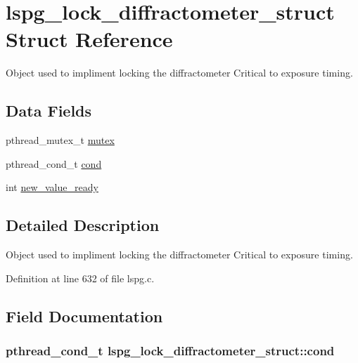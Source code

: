 \hypertarget{structlspg__lock__diffractometer__struct}{\section{lspg\-\_\-lock\-\_\-diffractometer\-\_\-struct Struct Reference}
\label{structlspg__lock__diffractometer__struct}
}


Object used to impliment locking the diffractometer Critical to exposure timing.  


\subsection*{Data Fields}
\begin{DoxyCompactItemize}
\item 
pthread\-\_\-mutex\-\_\-t \hyperlink{structlspg__lock__diffractometer__struct_a362e848dfd1551428b8d12d8776fd2ed}{mutex}
\item 
pthread\-\_\-cond\-\_\-t \hyperlink{structlspg__lock__diffractometer__struct_a7614c802af37c1d3358479a2c13ac898}{cond}
\item 
int \hyperlink{structlspg__lock__diffractometer__struct_ae94acdf44008ce48930e3083f08f5b6c}{new\-\_\-value\-\_\-ready}
\end{DoxyCompactItemize}


\subsection{Detailed Description}
Object used to impliment locking the diffractometer Critical to exposure timing. 

Definition at line 632 of file lspg.\-c.



\subsection{Field Documentation}
\hypertarget{structlspg__lock__diffractometer__struct_a7614c802af37c1d3358479a2c13ac898}{
\subsubsection[{cond}]{\setlength{\rightskip}{0pt plus 5cm}pthread\-\_\-cond\-\_\-t lspg\-\_\-lock\-\_\-diffractometer\-\_\-struct\-::cond}}\label{structlspg__lock__diffractometer__struct_a7614c802af37c1d3358479a2c13ac898}


